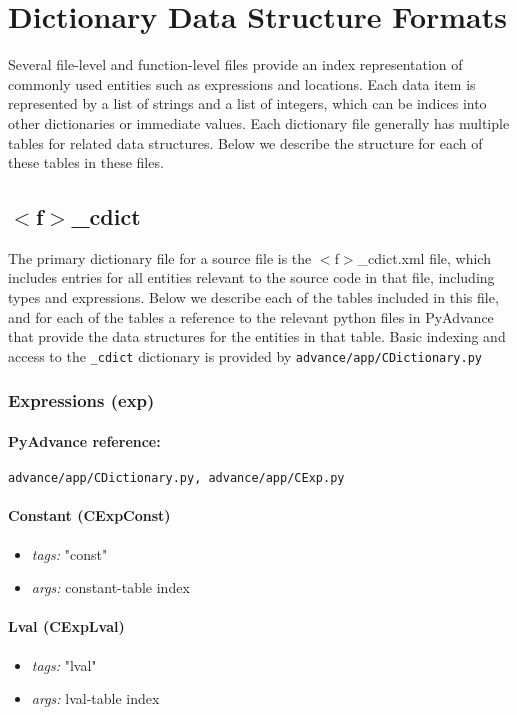\documentclass[11pt]{article}
\newcommand\fname{$<$f$>$}
\begin{document}
\section{Dictionary Data Structure Formats}

Several file-level and function-level files provide an index representation
of commonly used entities such as expressions and locations. Each data item is
represented by a list of strings and a list of integers, which can be indices
into other dictionaries or immediate values. Each dictionary file generally
has multiple tables for related data structures. Below we describe the
structure for each of these tables in these files.

\subsection{\fname\_cdict}

The primary dictionary file for a source file is the \fname\_cdict.xml file,
which includes entries for all entities relevant to the source code in that
file, including types and expressions. Below we describe each of the tables
included in this file, and for each of the tables a reference to the relevant
python files in PyAdvance that provide the data structures for the entities
in that table. Basic indexing and access to the {\tt \_cdict} dictionary is 
provided by {\tt advance/app/CDictionary.py}

\subsubsection{Expressions (exp)}

\paragraph{PyAdvance reference:} {\tt advance/app/CDictionary.py, advance/app/CExp.py}

\paragraph{Constant (CExpConst)}
\begin{itemize}
\item \emph{tags:} "const"
\item \emph{args:} constant-table index
\end{itemize}

\paragraph{Lval (CExpLval)}
\begin{itemize}
\item \emph{tags:} "lval"
\item \emph{args:} lval-table index
\end{itemize}
\end{document}
